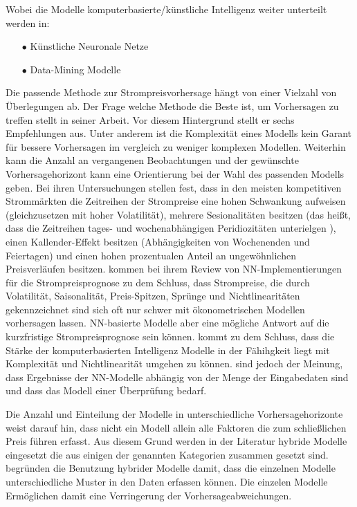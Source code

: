 Wobei die Modelle komputerbasierte/künstliche Intelligenz weiter unterteilt werden in: 
\begin{itemize}
\item[\textbf{$\bullet$}]%
Künstliche Neuronale Netze

\item[\textbf{$\bullet$}]%
Data-Mining Modelle
\end{itemize}


Die passende Methode zur Strompreisvorhersage hängt von einer Vielzahl von Überlegungen ab. Der Frage welche Methode die Beste ist, um Vorhersagen zu treffen stellt \citet{Chatfield1988} in seiner Arbeit. Vor diesem Hintergrund stellt er sechs Empfehlungen aus. Unter anderem ist die Komplexität eines Modells kein Garant für bessere Vorhersagen im vergleich zu weniger komplexen Modellen. Weiterhin kann die Anzahl an vergangenen Beobachtungen und der gewünschte Vorhersagehorizont kann eine Orientierung bei der Wahl des passenden Modells geben.
Bei ihren Untersuchungen stellen \citet{Nogales2002} fest, dass in den meisten kompetitiven Strommärkten die Zeitreihen der Strompreise eine hohen Schwankung aufweisen (gleichzusetzen mit hoher Volatilität), mehrere Sesionalitäten besitzen (das heißt, dass die Zeitreihen tages- und wochenabhängigen Peridiozitäten unterielgen ), einen Kallender-Effekt besitzen (Abhängigkeiten von Wochenenden und Feiertagen) und einen hohen prozentualen Anteil an ungewöhnlichen Preisverläufen besitzen. \citet{Vijayalakshmi2015} kommen bei ihrem Review von NN-Implementierungen für die Strompreisprognose zu dem Schluss, dass Strompreise, die durch Volatilität, Saisonalität, Preis-Spitzen, Sprünge und Nichtlinearitäten gekennzeichnet sind sich oft nur schwer mit ökonometrischen Modellen vorhersagen lassen. NN-basierte Modelle aber eine mögliche Antwort auf die kurzfristige Strompreisprognose sein können. \citet{Weron2014} kommt zu dem Schluss, dass die Stärke der komputerbasierten Intelligenz Modelle in der Fähihgkeit liegt mit Komplexität und Nichtlinearität umgehen zu können. \citet{Gareta2006} sind jedoch der Meinung, dass Ergebnisse der NN-Modelle abhängig von der Menge der Eingabedaten sind und dass das Modell einer Überprüfung bedarf.

Die Anzahl und Einteilung der Modelle in unterschiedliche Vorhersagehorizonte weist darauf hin, dass nicht ein Modell allein alle Faktoren die zum schließlichen Preis führen erfasst. Aus diesem Grund werden in der Literatur hybride Modelle eingesetzt die aus einigen der genannten Kategorien zusammen gesetzt sind. \citet{Cerjan2013} begründen die Benutzung hybrider Modelle damit, dass die einzelnen Modelle unterschiedliche Muster in den Daten erfassen können. Die einzelen Modelle Ermöglichen damit eine Verringerung der Vorhersageabweichungen.



